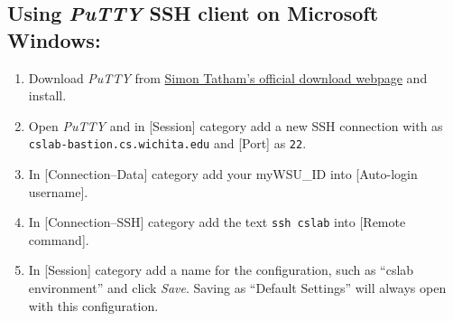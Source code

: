 \documentclass[12pt]{article}
\begin{document}
\subsection*{Using \textit{PuTTY} SSH client on Microsoft Windows:}
\begin{enumerate}

\item Download \textit{PuTTY} from \href{https://www.chiark.greenend.org.uk/~sgtatham/putty/latest.html}{Simon Tatham's official download webpage} and install.
\item Open \textit{PuTTY} and in [Session] category add a new SSH connection with  as \texttt{cslab-bastion.cs.wichita.edu} and [Port] as \texttt{22}.

\item In [Connection--Data] category add your myWSU\_ID into [Auto-login username].
\item In [Connection--SSH] category add the text \texttt{ssh cslab} into [Remote command].
\item In [Session] category add a name for the configuration, such as ``cslab environment'' and click \textit{Save}. Saving as ``Default Settings'' will always open with this configuration.


\end{enumerate}
\end{document}

